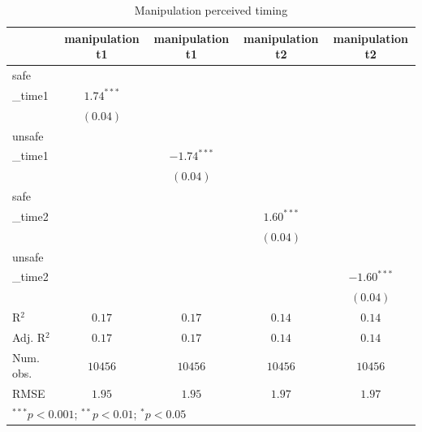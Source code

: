 
\begin{table}
\begin{center}
\begin{tabular}{l c c c c}
\hline
 & manipulation t1 & manipulation t1 & manipulation t2 & manipulation t2 \\
\hline
safe\\_time1   & $1.74^{***}$ &               &              &               \\
               & $(0.04)$     &               &              &               \\
unsafe\\_time1 &              & $-1.74^{***}$ &              &               \\
               &              & $(0.04)$      &              &               \\
safe\\_time2   &              &               & $1.60^{***}$ &               \\
               &              &               & $(0.04)$     &               \\
unsafe\\_time2 &              &               &              & $-1.60^{***}$ \\
               &              &               &              & $(0.04)$      \\
\hline
R$^2$          & $0.17$       & $0.17$        & $0.14$       & $0.14$        \\
Adj. R$^2$     & $0.17$       & $0.17$        & $0.14$       & $0.14$        \\
Num. obs.      & $10456$      & $10456$       & $10456$      & $10456$       \\
RMSE           & $1.95$       & $1.95$        & $1.97$       & $1.97$        \\
\hline
\multicolumn{5}{l}{\scriptsize{$^{***}p<0.001$; $^{**}p<0.01$; $^{*}p<0.05$}}
\end{tabular}
\caption{Manipulation perceived timing}
\label{table:coefficients}
\end{center}
\end{table}


